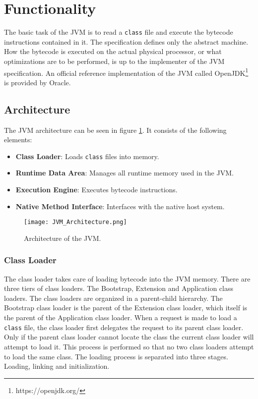 \section{Functionality}

The basic task of the JVM is to read a \texttt{class} file and execute the bytecode instructions contained in it. The specification defines only the abstract machine. How the bytecode is executed on the actual physical processor, or what optimizations are to be performed, is up to the implementer of the JVM specification. An official reference implementation of the JVM called OpenJDK\footnote{https://openjdk.org/} is provided by Oracle. 

\subsection{Architecture}

The JVM architecture can be seen in figure \ref{fig:JVMArchitecture}. It consists of the following elements: 

\begin{itemize}
    \item \textbf{Class Loader}: Loads \texttt{class} files into memory.
    \item \textbf{Runtime Data Area}: Manages all runtime memory used in the JVM.
    \item \textbf{Execution Engine}: Executes bytecode instructions.
    \item \textbf{Native Method Interface}: Interfaces with the native host system. 
\end{itemize}

\begin{figure}[]
    \centering
    \texttt{[image: JVM\_Architecture.png]}
    \caption{Architecture of the JVM.}
    \label{fig:JVMArchitecture}
\end{figure}

\subsubsection{Class Loader}

The class loader takes care of loading bytecode into the JVM memory.  There are three tiers of class loaders. The Bootstrap, Extension and Application class loaders. The class loaders are organized in a parent-child hierarchy. The Bootstrap class loader is the parent of the Extension class loader, which itself is the parent of the Application class loader. When a request is made to load a \texttt{class} file, the class loader first delegates the request to its parent class loader. Only if the parent class loader cannot locate the class the current class loader will attempt to load it. This process is performed so that no two class loaders attempt to load the same class. The loading process is separated into three stages. Loading, linking and initialization.

